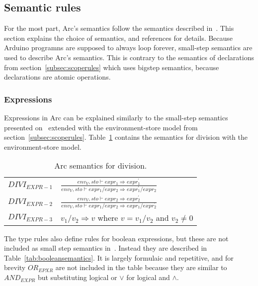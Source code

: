 \subsection{Semantic rules}\label{subsec:semanticrules}
For the most part, Arc's semantics follow the semantics described in~\cite{Huttel2010}. This section explains the choice of semantics, and references \cite{Huttel2010} for details. Because Arduino programns are supposed to always loop forever, small-step semantics are used to describe Arc's semantics. This is contrary to the semantics of declarations from section~\ref{subsec:scoperules} which uses bigstep semantics, because declarations are atomic operations.

\subsubsection{Expressions}
Expressions in Arc can be explained similarly to the small-step semantics presented on~\cite[p.~37]{Huttel2010} extended with the environment-store model from section~\ref{subsec:scoperules}. Table~\ref{tab:divisionsemantics} contains the semantics for division with the environment-store model.


\begin{table}[htbp]
    \centering
    \begin{tabular}{ll}
        \toprule
        $DIVI_{EXPR-1}$ & $\frac{env_V, sto \vdash expr_1 \Rightarrow expr^\prime_1}{env_V, sto \vdash expr_1 / expr_2 \Rightarrow expr^\prime_1 / expr_2}$ \\ [12pt]
        $DIVI_{EXPR-2}$ & $\frac{env_V, sto \vdash expr_2 \Rightarrow expr^\prime_2}{env_V, sto \vdash expr_1 / expr_2 \Rightarrow expr_1 / expr^\prime_2}$ \\ [12pt]
        $DIVI_{EXPR-3}$ & $v_1 / v_2 \Rightarrow v$ where $v =v_1 / v_2$ and $v_2 \neq 0$                                                                   \\
        \bottomrule
    \end{tabular}
    \caption{Arc semantics for division.}
    \label{tab:divisionsemantics}
\end{table}


The type rules also define rules for boolean expressions, but these are not included as small step semantics in~\cite{Huttel2010}. Instead they are described in Table~\ref{tab:booleansemantics}. It is largely formulaic and repetitive, and for brevity $OR_{EPXR}$ are not included in the table because they are similar to $AND_{EXPR}$ but substituting logical or $\lor$ for logical and $\land$.


